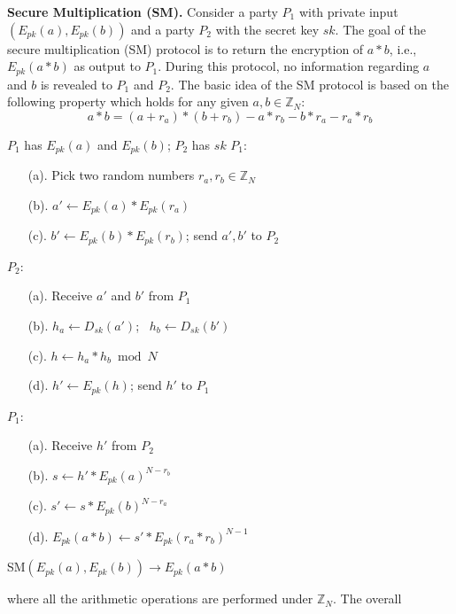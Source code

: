 \documentclass{article}
\begin{document}
\noindent \textbf {Secure Multiplication (SM). }
Consider a party $P_1$ with private input $(E_{pk}(a), E_{pk}(b))$ and a 
party $P_2$ with the secret key $sk$. The goal of the secure multiplication (SM) 
protocol is to return the encryption 
of $a \ast b$, i.e., $E_{pk}(a*b)$ as output to $P_1$. During this protocol, no information regarding 
$a$ and $b$ is revealed to $P_1$ and $P_2$. The basic idea of the SM protocol 
is based on the following property which holds 
for any given $a,b \in \mathbb{Z}_N$: 
\begin{equation}\label{eq:mult}
 a\ast b = (a+r_a)\ast (b+r_b) - a\ast r_b - b\ast r_a - r_a\ast r_b
\end{equation}
\begin{algorithm}[t]
\begin{algorithmic}[1]
\REQUIRE $P_1$ has $E_{pk}(a)$ and $E_{pk}(b)$; $P_2$ has $sk$
\STATE $P_1$:
\begin{enumerate}\itemsep=0pt
    \item[(a).]  Pick two random numbers $r_a, r_b \in \mathbb{Z}_N$
    \item[(b).]  $a' \gets E_{pk}(a)\ast E_{pk}(r_a)$
    \item[(c).]  $b' \gets E_{pk}(b)\ast E_{pk}(r_b)$; send $a', b'$ to $P_2$    
\end{enumerate}
\STATE $P_2$:
\begin{enumerate}\itemsep=0pt
    \item[(a).]  Receive $a'$ and $b'$ from $P_1$ 
    \item[(b).]  $h_a \gets D_{sk}(a')$;~ $h_b \gets D_{sk}(b')$
    \item[(c).] $h \gets h_a \ast h_b \bmod N$
    \item[(d).] $h' \gets E_{pk}(h)$; send $h'$ to $P_1$
\end{enumerate}
\STATE $P_1$:
\begin{enumerate}\itemsep=0pt
    \item[(a).]  Receive $h'$ from $P_2$ 
    \item[(b).]  $s \gets h' \ast E_{pk}(a)^{N- r_b}$
    \item[(c).]  $s' \gets s \ast E_{pk}(b)^{N- r_a}$
    \item[(d).]  $E_{pk}(a\ast b) \gets s'\ast E_{pk}(r_a\ast r_b)^{N-1}$
\end{enumerate}
\end{algorithmic}
\caption{SM$(E_{pk}(a), E_{pk}(b)) \rightarrow E_{pk}(a\ast b)$}
\label{alg:sm}
\end{algorithm}
\noindent where all the arithmetic operations are performed under $\mathbb{Z}_N$. The overall 
\end{document}

